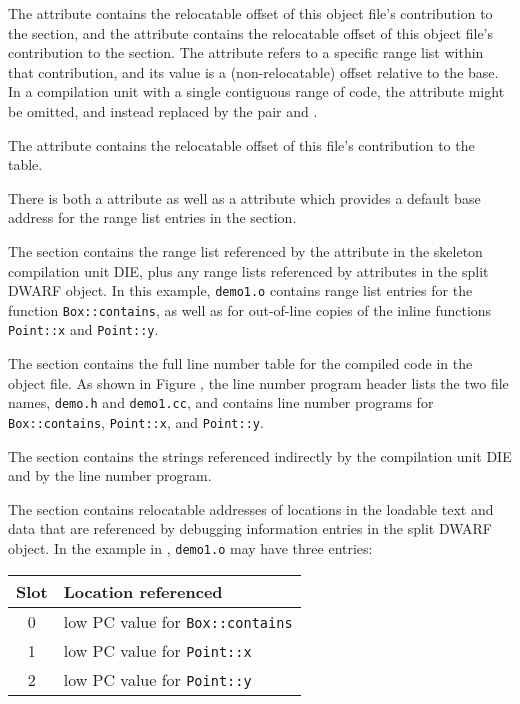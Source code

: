 The \DWATaddrbase{} attribute contains the relocatable offset of
this object file's contribution to the \dotdebugaddr{} section, and
the \DWATrangesbase{} attribute contains the relocatable offset
of this object file's contribution to the \dotdebugranges{} section.
The \DWATranges{} attribute refers to a specific range list within
that contribution, and its value is a (non-relocatable) offset
relative to the base. In a compilation unit with a single
contiguous range of code, the \DWATranges{} attribute might be
omitted, and instead replaced by the pair \DWATlowpc{} and
\DWAThighpc.

The \DWATstmtlist{} attribute contains the relocatable offset of
this file's contribution to the \dotdebugline{} table.

There is both a \DWATranges{} attribute as well as a \DWATlowpc{} 
attribute which 
provides a default base address for the range list entries in the
\dotdebugranges{} section. 

The \dotdebugranges{} section contains the range list referenced by
the \DWATranges{} attribute in the skeleton compilation unit DIE,
plus any range lists referenced by \DWATranges{} attributes in the
split DWARF object. In this example, \texttt{demo1.o} contains range
list entries for the function \texttt{Box::contains}, as well as for
out-of-line copies of the inline functions \texttt{Point::x} and 
\texttt{Point::y}.

The \dotdebugline{} section contains the full line number table for
the compiled code in the object file. As shown in
Figure , the line
number program header lists the two file names, \texttt{demo.h} and
\texttt{demo1.cc}, and contains line number programs for
\texttt{Box::contains}, \texttt{Point::x}, and \texttt{Point::y}.

The \dotdebugstr{} section contains the strings referenced indirectly
by the compilation unit DIE and by the line number program.

The \dotdebugaddr{} section contains relocatable addresses of
locations in the loadable text and data that are referenced by
debugging information entries in the split DWARF object. In the
example in , 
\texttt{demo1.o} may have three entries:
\begin{center}
\begin{tabular}{cl}
Slot & Location referenced \\
\hline
   0   &  low PC value for \texttt{Box::contains}  \\
   1   &  low PC value for \texttt{Point::x}       \\
   2   &  low PC value for \texttt{Point::y}       \\
\end{tabular}
\end{center}

